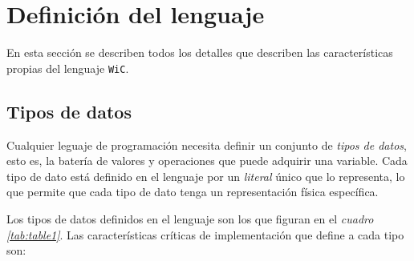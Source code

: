 \documentclass[11pt, english]{article}
\begin{document}
\newcommand{\CC}{C\nolinebreak\hspace{-.05em}\raisebox{.4ex}{\tiny\bf +}\nolinebreak\hspace{-.10em}\raisebox{.4ex}{\tiny\bf +}}
\def\CC{{C\nolinebreak[4]\hspace{-.05em}\raisebox{.4ex}{\tiny\bf ++}}}

\tableofcontents
\newpage

\label{Resumen}

\section{Definición del lenguaje}\label{Definicion-lenguaje}
En esta sección se describen todos los detalles que describen las características propias del lenguaje \texttt{WiC}.

\subsection{Tipos de datos}\label{data-type}
Cualquier leguaje de programación necesita definir un conjunto de \emph{tipos de datos}, esto es, la batería de valores y operaciones que puede adquirir una variable. Cada tipo de dato está definido en el lenguaje por un \emph{literal} único que lo representa, lo que permite que cada tipo de dato tenga un representación física específica.

Los tipos de datos definidos en el lenguaje son los que figuran en el \emph{cuadro \ref{tab:table1}}. Las características críticas de implementación que define a cada tipo son:
\end{document}
